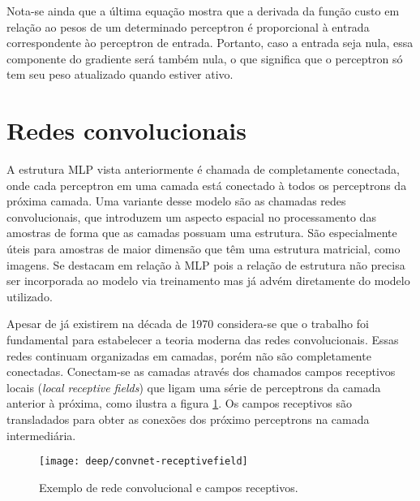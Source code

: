 Nota-se ainda que a última equação mostra que a derivada da função custo em relação ao pesos de um determinado perceptron é proporcional à entrada correspondente ào perceptron de entrada. Portanto, caso a entrada seja nula, essa componente do gradiente será também nula, o que significa que o perceptron só tem seu peso atualizado quando estiver ativo.

\section{Redes convolucionais}
\label{sec:convnets}

A estrutura MLP vista anteriormente é chamada de completamente conectada, onde cada perceptron em uma camada está conectado à todos os perceptrons da próxima camada. Uma variante desse modelo são as chamadas redes convolucionais, que introduzem um aspecto espacial no processamento das amostras de forma que as camadas possuam uma estrutura. São especialmente úteis para amostras de maior dimensão que têm uma estrutura matricial, como imagens. Se destacam em relação à MLP pois a relação de estrutura não precisa ser incorporada ao modelo via treinamento mas já advém diretamente do modelo utilizado.

Apesar de já existirem na década de 1970 considera-se que o trabalho \cite{lecun1998convnet} foi fundamental para estabelecer a teoria moderna das redes convolucionais. Essas redes continuam organizadas em camadas, porém não são completamente conectadas. Conectam-se as camadas através dos chamados campos receptivos locais (\textit{local receptive fields}) que ligam uma série de perceptrons da camada anterior à próxima, como ilustra a figura \ref{fig:convnet-receptivefield}. Os campos receptivos são transladados para obter as conexões dos próximo perceptrons na camada intermediária.

\begin{figure}[h]
\centering
\texttt{[image: deep/convnet-receptivefield]}
\caption{Exemplo de rede convolucional e campos receptivos.}
\label{fig:convnet-receptivefield}
\end{figure}

